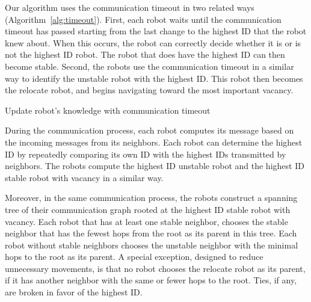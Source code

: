 Our algorithm uses the communication timeout in two related ways (Algorithm~\ref{alg:timeout}).
%
First, each robot waits until the communication timeout has passed starting from the
last change to the highest ID that the robot knew about.  
%
When this occurs,
the robot can correctly decide whether it is or is not the highest ID robot.
%
The robot that does have the highest ID can then become stable.
%
Second, the robots use the communication timeout in a similar way to identify
the unstable robot with the highest ID.  
%
This robot then becomes the relocate
robot, and begins navigating toward the most important vacancy.

\begin{algorithm}
{}
  \caption{Update robot's knowledge with communication timeout}
  \label{alg:timeout}
\end{algorithm}


During the communication process, each robot computes its message
based on the incoming messages from its neighbors. 
%
Each robot can determine the highest ID by repeatedly comparing its own ID with the highest IDs transmitted by neighbors.
%
The robots compute the highest ID unstable robot and the highest ID stable
robot with vacancy in a similar way.

Moreover, in the same communication process, the robots construct a spanning
tree of their communication graph rooted at the highest ID stable robot with
vacancy.  
%
Each robot that has at least one stable neighbor, chooses the stable neighbor that has the fewest hops from the root as its parent in this tree.
%
Each robot without stable neighbors chooses the unstable neighbor with the minimal hops to the root as its parent.  
%
A special exception, designed to reduce unnecessary movements, is that no robot chooses the relocate robot as its parent, if it has another neighbor with the same or fewer hops to the root.  
%
Ties, if any, are broken in favor of the
highest ID.  



